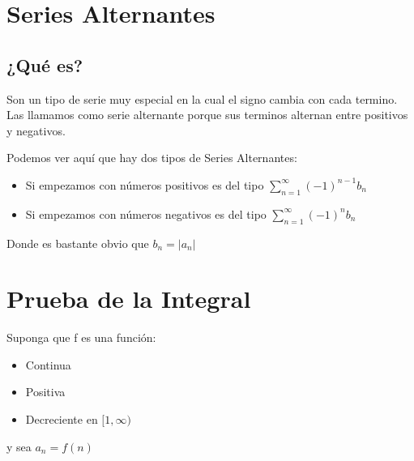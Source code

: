 \documentclass[12pt]{article}							    %
\begin{document}
\clearpage
\section{Series Alternantes}


\subsection{¿Qué es?}
Son un tipo de serie muy especial en la cual el signo cambia con cada termino. Las llamamos como serie alternante porque sus terminos alternan entre positivos y negativos.

Podemos ver aquí que hay dos tipos de Series Alternantes:
\begin{itemize}
    \item Si empezamos con números positivos es del tipo $\sum_{n=1}^{\infty} (-1)^{n-1} b_n$
    \item Si empezamos con números negativos es del tipo $\sum_{n=1}^{\infty} (-1)^n b_n$
\end{itemize}

Donde es bastante obvio que $b_n = |a_n|$




\clearpage
\section{Prueba de la Integral}
Suponga que f es una función:

\begin{itemize}
    \item Continua
    \item Positiva
    \item Decreciente en $[1, \infty)$
\end{itemize}

y sea $a_n = f(n)$
\end{document}

